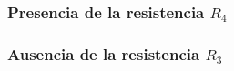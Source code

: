 \subsubsection{Presencia de la resistencia $R_4$}

\subsubsection{Ausencia de la resistencia $R_3$}
